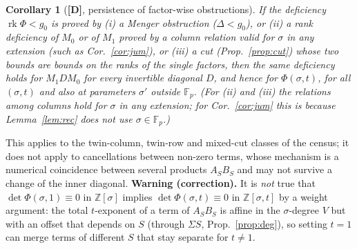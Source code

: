 \documentclass[11pt,a4paper]{article}
\newtheorem{corollary}[theorem]{Corollary}
\newcommand{\F}{\mathbb{F}}
\begin{document}
\begin{corollary}[\textbf{[D]}, persistence of factor-wise obstructions]
\label{cor:persist}
If the deficiency $\operatorname{rk}\Phi<g_0$ is proved by (i) a Menger obstruction
($\Delta<g_0$), or (ii) a rank deficiency of $M_0$ or of $M_1$ proved by a column relation valid for $\sigma$ in any extension (such as Cor.~\ref{cor:jum}), or (iii) a cut (Prop.~\ref{prop:cut}) whose two bounds
are bounds on the ranks of the single factors, then the same deficiency holds for
$M_1DM_0$ for every invertible diagonal $D$, and hence for $\Phi(\sigma,t)$, for
all $(\sigma,t)$ and also at parameters $\sigma'$ outside $\F_p$. (For (ii) and (iii) the relations among columns hold for $\sigma$ in any extension; for Cor.~\ref{cor:jum} this is because Lemma~\ref{lem:rec} does not use $\sigma\in\F_p$.)
\end{corollary}
This applies to the twin-column, twin-row and mixed-cut classes of the census;
it does not apply to cancellations between non-zero terms, whose mechanism is a
numerical coincidence between several products $A_SB_S$ and may not survive a
change of the inner diagonal. \textbf{Warning (correction).} It is \emph{not}
true that $\det\Phi(\sigma,1)\equiv0$ in $\mathbb Z[\sigma]$ implies
$\det\Phi(\sigma,t)\equiv0$ in $\mathbb Z[\sigma,t]$ by a weight argument: the
total $t$-exponent of a term of $A_SB_S$ is affine in the $\sigma$-degree $V$ but
with an offset that depends on $S$ (through $\Sigma S$, Prop.~\ref{prop:deg}), so
setting $t=1$ can merge terms of different $S$ that stay separate for $t\ne1$.
\end{document}
